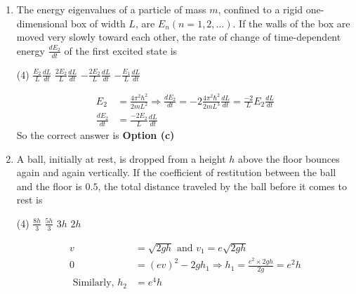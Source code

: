 \begin{enumerate}
\begin{answer}
	\begin{align*}
	\text{The energy density at the temperature $T$ is,}
	\intertext {Energy density for $2 D$ photon, $u=\frac{2 \zeta(3)\left(k_{B} T\right)^{3}}{\hbar c^{2} \pi}, \zeta(s)=1+\frac{1}{2^{2}}+\frac{1}{3^{3}}+\ldots$, Riemann Zeta function $u \propto T^{3}$}
	\end{align*}
		So the correct answer is \textbf{Option (a)}
\end{answer}
\item The energy eigenvalues of a particle of mass $m$, confined to a rigid one-dimensional box of width $L$, are $E_{n}(n=1,2, \ldots)$. If the walls of the box are moved very slowly toward each other, the rate of change of time-dependent energy $\frac{d E_{2}}{d t}$ of the first excited state is
 \begin{tasks}(4)
	\task[\textbf{a.}]$\frac{E_{2}}{L} \frac{d L}{d t}$
	\task[\textbf{b.}]$\frac{2 E_{2}}{L} \frac{d L}{d t}$
	\task[\textbf{c.}]$-\frac{2 E_{2}}{L} \frac{d L}{d t}$
	\task[\textbf{d.}]$-\frac{E_{1}}{L} \frac{d L}{d t}$ 
\end{tasks}
\begin{answer}
	\begin{align*}
	E_{2}&=\frac{4 \pi^{2} \hbar^{2}}{2 m L^{2}} \Rightarrow \frac{d E_{2}}{d t}=-2 \frac{4 \pi^{2} \hbar^{2}}{2 m L^{3}} \frac{d L}{d t}=\frac{-2}{L} E_{2} \frac{d L}{d t}\\
	\frac{d E_{2}}{d t}&=\frac{-2 E_{2}}{L} \frac{d L}{d t}
	\end{align*}
		So the correct answer is \textbf{Option (c)}
\end{answer}
\item A ball, initially at rest, is dropped from a height $h$ above the floor bounces again and again vertically. If the coefficient of restitution between the ball and the floor is $0.5$, the total distance traveled by the ball before it comes to rest is
 \begin{tasks}(4)
	\task[\textbf{a.}]$\frac{8 h}{3}$
	\task[\textbf{b.}]$\frac{5 h}{3}$
	\task[\textbf{c.}] $3 h$
	\task[\textbf{d.}] $2 h$
\end{tasks}
\begin{answer}
	\begin{align*}
	v&=\sqrt{2 g h} \text { and } v_{1}=e \sqrt{2 g h}\\
	0&=(e v)^{2}-2 g h_{1} \Rightarrow h_{1}=\frac{e^{2} \times 2 g h}{2 g}=e^{2} h\\
	\text { Similarly, } h_{2}&=e^{4} h\\

\end{align*}
\end{answer}
\end{enumerate}
